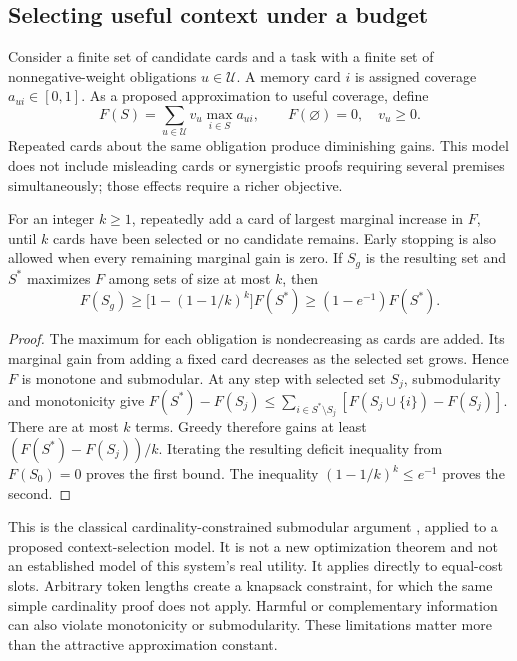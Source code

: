 \subsection{Selecting useful context under a budget}

Consider a finite set of candidate cards and a task with a finite set of nonnegative-weight obligations $u\in\mathcal U$. A memory card $i$ is assigned coverage $a_{ui}\in[0,1]$. As a proposed approximation to useful coverage, define
\[
F(S)=\sum_{u\in\mathcal U}v_u\max_{i\in S}a_{ui},
\qquad F(\varnothing)=0,\quad v_u\geq0.
\]
Repeated cards about the same obligation produce diminishing gains. This model does not include misleading cards or synergistic proofs requiring several premises simultaneously; those effects require a richer objective.

\begin{proposition}
For an integer $k\geq1$, repeatedly add a card of largest marginal increase in $F$, until $k$ cards have been selected or no candidate remains. Early stopping is also allowed when every remaining marginal gain is zero. If $S_g$ is the resulting set and $S^\ast$ maximizes $F$ among sets of size at most $k$, then
\[
F(S_g)\geq\bigl[1-(1-1/k)^k\bigr]F(S^\ast)
\geq(1-e^{-1})F(S^\ast).
\]
\end{proposition}
\begin{proof}
The maximum for each obligation is nondecreasing as cards are added. Its marginal gain from adding a fixed card decreases as the selected set grows. Hence $F$ is monotone and submodular. At any step with selected set $S_j$, submodularity and monotonicity give
$F(S^\ast)-F(S_j)\leq\sum_{i\in S^\ast\setminus S_j}
[F(S_j\cup\{i\})-F(S_j)]$.
There are at most $k$ terms. Greedy therefore gains at least
$(F(S^\ast)-F(S_j))/k$. Iterating the resulting deficit inequality from $F(S_0)=0$ proves the first bound. The inequality $(1-1/k)^k\leq e^{-1}$ proves the second.
\end{proof}

This is the classical cardinality-constrained submodular argument \citep{nemhauser1978}, applied to a proposed context-selection model. It is not a new optimization theorem and not an established model of this system's real utility. It applies directly to equal-cost slots. Arbitrary token lengths create a knapsack constraint, for which the same simple cardinality proof does not apply. Harmful or complementary information can also violate monotonicity or submodularity. These limitations matter more than the attractive approximation constant.

